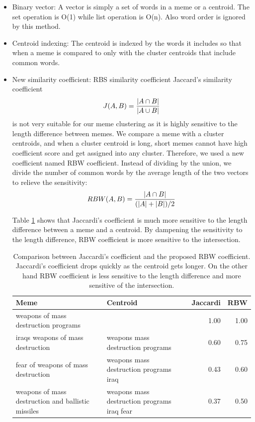 \documentclass{sig-alternate}
\begin{document}
\begin{itemize}
 \item Binary vector: A vector is simply a set of words in a meme or a centroid. The set operation is O(1) while list operation is O(n). Also word order is ignored by this method.
 \item Centroid indexing: The centroid is indexed by the words it includes so that when a meme is compared to only with the cluster centroids that include common words.
 \item New similarity coefficient: RBS similarity coefficient
 Jaccard's similarity coefficient 
\begin{displaymath} 
 J(A,B) = {{|A \cap B|}\over{|A \cup B|}}
\end{displaymath} 
  is not very suitable for our meme clustering as it is highly sensitive to the length difference between memes. We compare a meme with a cluster centroids, and when a cluster centroid is long, short memes cannot have high coefficient score and get assigned into any cluster. Therefore, we used a new coefficient named RBW coefficient. Instead of dividing by the union, we divide the number of common words by the average length of the two vectors to relieve the sensitivity:\\
\begin{displaymath}
RBW(A, B) = {{|A \cap B|} \over {(|A|+|B|) / 2} }
\end{displaymath}

Table \ref{table:sim} shows that Jaccardi's coefficient is much more sensitive to the length difference between a meme and a centroid. By dampening the sensitivity to the length difference, RBW coefficient is more sensitive to the intersection. 

\begin{table}[h!t!]
\begin{center}
\begin{tabular}{p{3.0cm}|p{2.2cm}|r|r}
\hline
Meme&Centroid&Jaccardi&RBW\\
\hline
weapons of mass destruction programs&&1.00&1.00\\
\hline
iraqs weapons of mass destruction & weapons mass destruction programs&0.60&0.75\\
\hline
fear of weapons of mass destruction & weapons mass destruction programs iraq&0.43&0.60\\
\hline
weapons of mass destruction and ballistic missiles&weapons mass destruction programs iraq fear&0.37&0.50\\
\hline
\end{tabular}
\caption{Comparison between Jaccardi's coefficient and the proposed RBW coefficient. Jaccardi's coefficient drops quickly as the centroid gets longer. On the other hand RBW coefficient is less sensitive to the length difference and more sensitive of the intersection.}
\label{table:sim}
\end{center}
\end{table}


\end{itemize}
\end{document}
